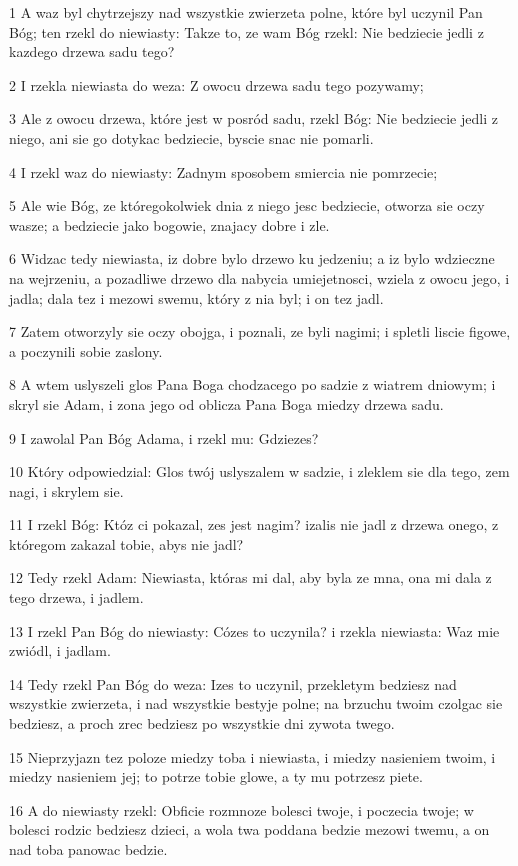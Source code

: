 \par 1 A waz byl chytrzejszy nad wszystkie zwierzeta polne, które byl uczynil Pan Bóg; ten rzekl do niewiasty: Takze to, ze wam Bóg rzekl: Nie bedziecie jedli z kazdego drzewa sadu tego?
\par 2 I rzekla niewiasta do weza: Z owocu drzewa sadu tego pozywamy;
\par 3 Ale z owocu drzewa, które jest w posród sadu, rzekl Bóg: Nie bedziecie jedli z niego, ani sie go dotykac bedziecie, byscie snac nie pomarli.
\par 4 I rzekl waz do niewiasty: Zadnym sposobem smiercia nie pomrzecie;
\par 5 Ale wie Bóg, ze któregokolwiek dnia z niego jesc bedziecie, otworza sie oczy wasze; a bedziecie jako bogowie, znajacy dobre i zle.
\par 6 Widzac tedy niewiasta, iz dobre bylo drzewo ku jedzeniu; a iz bylo wdzieczne na wejrzeniu, a pozadliwe drzewo dla nabycia umiejetnosci, wziela z owocu jego, i jadla; dala tez i mezowi swemu, który z nia byl; i on tez jadl.
\par 7 Zatem otworzyly sie oczy obojga, i poznali, ze byli nagimi; i spletli liscie figowe, a poczynili sobie zaslony.
\par 8 A wtem uslyszeli glos Pana Boga chodzacego po sadzie z wiatrem dniowym; i skryl sie Adam, i zona jego od oblicza Pana Boga miedzy drzewa sadu.
\par 9 I zawolal Pan Bóg Adama, i rzekl mu: Gdziezes?
\par 10 Który odpowiedzial: Glos twój uslyszalem w sadzie, i zleklem sie dla tego, zem nagi, i skrylem sie.
\par 11 I rzekl Bóg: Któz ci pokazal, zes jest nagim? izalis nie jadl z drzewa onego, z któregom zakazal tobie, abys nie jadl?
\par 12 Tedy rzekl Adam: Niewiasta, któras mi dal, aby byla ze mna, ona mi dala z tego drzewa, i jadlem.
\par 13 I rzekl Pan Bóg do niewiasty: Cózes to uczynila? i rzekla niewiasta: Waz mie zwiódl, i jadlam.
\par 14 Tedy rzekl Pan Bóg do weza: Izes to uczynil, przekletym bedziesz nad wszystkie zwierzeta, i nad wszystkie bestyje polne; na brzuchu twoim czolgac sie bedziesz, a proch zrec bedziesz po wszystkie dni zywota twego.
\par 15 Nieprzyjazn tez poloze miedzy toba i niewiasta, i miedzy nasieniem twoim, i miedzy nasieniem jej; to potrze tobie glowe, a ty mu potrzesz piete.
\par 16 A do niewiasty rzekl: Obficie rozmnoze bolesci twoje, i poczecia twoje; w bolesci rodzic bedziesz dzieci, a wola twa poddana bedzie mezowi twemu, a on nad toba panowac bedzie.

